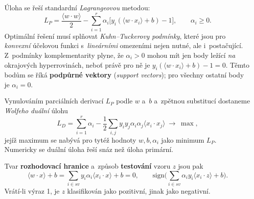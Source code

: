\documentclass[11pt,a4paper]{article}
\theoremstyle{definition}
\begin{document}
\begin{defbox}
Úloha se řeší standardní \emph{Lagrangeovou} metodou:
\[ L_P=\frac{\langle w\cdot w\rangle}{2}-\sum_{i=1}^{r}\alpha_i
   \big[y_i(\langle w\cdot x_i\rangle+b)-1\big],\qquad \alpha_i\ge 0. \]
Optimální řešení musí splňovat \emph{Kuhn--Tuckerovy podmínky}, které jsou pro \emph{konvexní}
účelovou funkci s~\emph{lineárními} omezeními nejen nutné, ale i~postačující. Z~podmínky
komplementarity plyne, že $\alpha_i>0$ mohou mít jen body ležící \emph{na} okrajových
hyperrovinách, neboť právě pro ně je $y_i(\langle w\cdot x_i\rangle+b)-1=0$. Těmto bodům se
říká \textbf{podpůrné vektory} (\emph{support vectors}); pro všechny ostatní body je
$\alpha_i=0$.

Vynulováním parciálních derivací $L_P$ podle $w$ a~$b$ a~zpětnou substitucí dostaneme
\emph{Wolfeho duální} úlohu
\[ L_D=\sum_{i=1}^{r}\alpha_i-\frac12\sum_{i,j}y_iy_j\alpha_i\alpha_j
   \langle x_i\cdot x_j\rangle\ \longrightarrow\ \max, \]
jejíž maximum se nabývá pro tytéž hodnoty $w,b,\alpha_i$ jako minimum $L_P$. Numericky se
duální úloha řeší snáz než úloha primární.

Tvar \textbf{rozhodovací hranice} a~způsob \textbf{testování} vzoru $z$ jsou pak
\[ \langle w\cdot x\rangle+b=\sum_{i\in \mathit{sv}}y_i\alpha_i\langle x_i\cdot x\rangle+b=0,
\qquad
\mathrm{sign}\Big(\sum_{i\in \mathit{sv}}\alpha_iy_i\langle x_i\cdot z\rangle+b\Big). \]
Vrátí-li výraz 1, je $z$ klasifikován jako pozitivní, jinak jako negativní.
\end{defbox}
\end{document}

